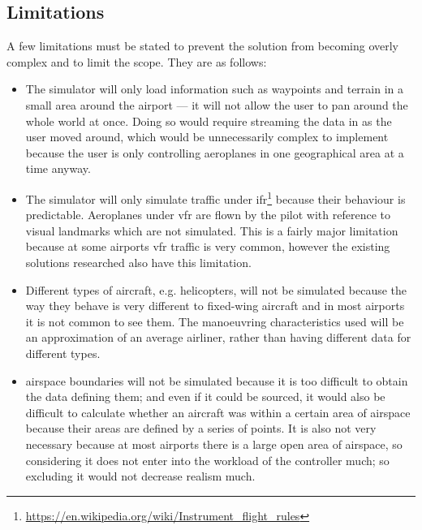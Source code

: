 \documentclass{article}
\begin{document}
\subsection{Limitations}
A few limitations must be stated to prevent the solution from becoming overly complex and to limit the scope.
They are as follows:
\begin{itemize}
    \item The simulator will only load information such as waypoints and terrain in a small area around the airport --- it will not allow the user to pan around the whole world at once.
    Doing so would require streaming the data in as the user moved around, which would be unnecessarily complex to implement because the user is only controlling aeroplanes in one geographical area at a time anyway.
    \item The simulator will only simulate traffic under \acrfull{ifr}\footnote{\url{https://en.wikipedia.org/wiki/Instrument_flight_rules}} because their behaviour is predictable.
    Aeroplanes under \acrfull{vfr} are flown by the pilot with reference to visual landmarks which are not simulated.
    This is a fairly major limitation because at some airports \acrshort{vfr} traffic is very common, however the existing solutions researched also have this limitation.
    \item Different types of aircraft, e.g. helicopters, will not be simulated because the way they behave is very different to fixed-wing aircraft and in most airports it is not common to see them.
    The manoeuvring characteristics used will be an approximation of an average airliner, rather than having different data for different types.
    \item \Gls{airspace} boundaries will not be simulated because it is too difficult to obtain the data defining them; and even if it could be sourced, it would also be difficult to calculate whether an aircraft was within a certain area of airspace because their areas are defined by a series of points.
    It is also not very necessary because at most airports there is a large open area of \gls{airspace}, so considering it does not enter into the workload of the controller much; so excluding it would not decrease realism much.
\end{itemize}


\end{document}
